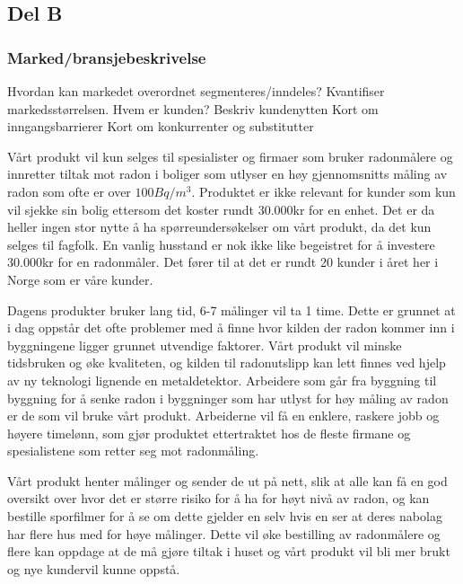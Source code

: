 \subsection{Del B}

\subsubsection{Marked/bransjebeskrivelse}

Hvordan kan markedet overordnet segmenteres/inndeles? Kvantifiser markedsstørrelsen. 
Hvem er kunden? Beskriv kundenytten 
Kort om inngangsbarrierer 
Kort om konkurrenter og substitutter 


Vårt produkt vil kun selges til spesialister og firmaer som bruker radonmålere og innretter tiltak mot radon i boliger som utlyser en høy gjennomsnitts måling av radon som ofte er over $100 Bq/m^3$. Produktet er ikke relevant for kunder som kun vil sjekke sin bolig ettersom det koster rundt 30.000kr for en enhet. Det er da heller ingen stor nytte å ha spørreundersøkelser om vårt produkt, da det kun selges til fagfolk. En vanlig husstand er nok ikke like begeistret for å investere 30.000kr for en radonmåler. Det fører til at det er rundt 20 kunder i året her i Norge som er våre kunder.  

Dagens produkter bruker lang tid, 6-7 målinger vil ta 1 time. Dette er grunnet at i dag oppstår det ofte problemer med å finne hvor kilden der radon kommer inn i byggningene ligger grunnet utvendige faktorer. Vårt produkt vil minske tidsbruken og øke kvaliteten, og kilden til radonutslipp kan lett finnes ved hjelp av ny teknologi lignende en metaldetektor. Arbeidere som går fra byggning til byggning for å senke radon i byggninger som har utlyst for høy måling av radon er de som vil bruke vårt produkt. Arbeiderne vil få en enklere, raskere jobb og høyere timelønn, som gjør produktet ettertraktet hos de fleste firmane og spesialistene som retter seg mot radonmåling. 

Vårt produkt henter målinger og sender de ut på nett, slik at alle kan få en god oversikt over hvor det er større risiko for å ha for høyt nivå av radon, og kan bestille sporfilmer for å se om dette gjelder en selv hvis en ser at deres nabolag har flere hus med for høye målinger. Dette vil øke bestilling av radonmålere og flere kan oppdage at de må gjøre tiltak i huset og vårt produkt vil bli mer brukt og nye kundervil kunne oppstå. 

